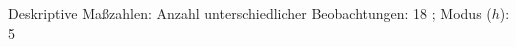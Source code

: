 				\label{tableValues:adem05a_g2d}
				\vspace*{-\baselineskip}
                    \begin{noten}
                	    \note{} Deskriptive Maßzahlen:
                	    Anzahl unterschiedlicher Beobachtungen: 18%
                	    ; 
                	      Modus ($h$): 5
                     \end{noten}

